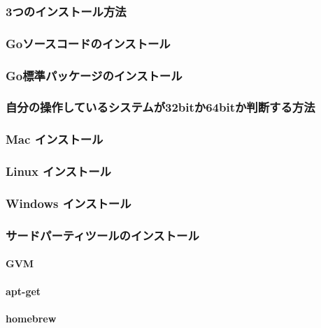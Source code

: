 \subsubsection{3つのインストール方法}

\subsubsection{Goソースコードのインストール}

\subsubsection{Go標準パッケージのインストール}

\subsubsection{自分の操作しているシステムが32bitか64bitか判断する方法}

\subsubsection{Mac インストール}

\subsubsection{Linux インストール}

\subsubsection{Windows インストール}

\subsubsection{サードパーティツールのインストール}
\paragraph{GVM}

\paragraph{apt-get}

\paragraph{homebrew}

